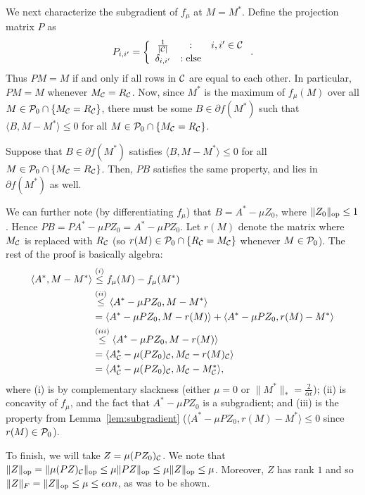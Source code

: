 \documentclass[11pt]{article}
\newcommand{\Mm}{M^*}
\newcommand{\Aa}{A^*}
\begin{document}
We next characterize the subgradient of $f_{\mu}$ at $M = \Mm$.
Define the projection matrix $P$ as
\[ P_{i,i'} = \left\{ \begin{array}{ccl} \frac{1}{|\mathcal{C}|} & : & i, i' \in \mathcal{C} \\ \delta_{i,i'} & : \text{else} \end{array} \right.. \]
Thus $PM = M$ if and only if all rows in $\mathcal{C}$ are equal to each other.
In particular, $PM = M$ whenever $M_{\mathcal{C}} = R_{\mathcal{C}}$. Now, since $\Mm$ is the maximum 
of $f_{\mu}(M)$ over all $M \in \mathcal{P}_0 \cap \{M_{\mathcal{C}} = R_{\mathcal{C}}\}$, there must be some 
$B \in \partial f(\Mm)$ such that $\langle B, M - \Mm \rangle \leq 0$ for all $M \in \mathcal{P}_0 \cap \{M_{\mathcal{C}} = R_{\mathcal{C}}\}$.
\begin{lemma}
\label{lem:subgradient}
Suppose that $B \in \partial f(\Mm)$ satisfies $\langle B, M - \Mm \rangle \leq 0$ for all $M \in \mathcal{P}_0 \cap \{M_{\mathcal{C}} = R_{\mathcal{C}}\}$. 
Then, $PB$ satisfies the same property, and lies in $\partial f(\Mm)$ as well.
\end{lemma}
We can further note (by differentiating $f_{\mu}$) that 
$B = \Aa - \mu Z_0$, where $\|Z_0\|_{\mathrm{op}} \leq 1$. Hence 
$PB = P\Aa - \mu PZ_0 = \Aa - \mu PZ_0$. Let $r(M)$ denote the 
matrix where $M_{\mathcal{C}}$ is replaced with $R_{\mathcal{C}}$ (so $r(M) \in \mathcal{P}_0 \cap \{R_{\mathcal{C}} = M_{\mathcal{C}}\}$ 
whenever $M \in \mathcal{P}_0$). The rest of the proof is basically algebra:
\begin{align}
\langle \Aa, M - \Mm \rangle &\stackrel{(i)}{\leq} f_{\mu}(M) - f_{\mu}(\Mm) \\
 &\stackrel{(ii)}{\leq} \langle \Aa - \mu PZ_0, M - \Mm \rangle \\
 &= \langle \Aa - \mu PZ_0, M - r(M) \rangle + \langle \Aa - \mu PZ_0, r(M) - \Mm \rangle \\
 &\stackrel{(iii)}{\leq} \langle \Aa - \mu PZ_0, M - r(M) \rangle \\
 &= \langle \Aa_{\sC} - \mu (PZ_0)_{\sC}, M_{\sC} - r(M)_{\sC} \rangle \\
 &= \langle \Aa_{\sC} - \mu (PZ_0)_{\sC}, M_{\sC} - \Mm_{\sC} \rangle,
\end{align}
where (i) is by complementary slackness (either $\mu = 0$ or $\|\Mm\|_* = \frac{2}{\alpha\epsilon}$); 
(ii) is concavity of $f_{\mu}$, and the fact that $\Aa - \mu PZ_0$ is a subgradient; and 
(iii) is the property from Lemma~\ref{lem:subgradient} ($\langle \Aa - \mu PZ_0, r(M) - \Mm \rangle \leq 0$ since 
$r(M) \in \mathcal{P}_0$).

To finish, we will take $Z = \mu (PZ_0)_{\mathcal{C}}$. We note that
$\|Z\|_{\mathrm{op}} = \|\mu (PZ)_{\mathcal{C}}\|_{\mathrm{op}} \leq \mu \|PZ\|_{\mathrm{op}} \leq \mu \|Z\|_{\mathrm{op}} \leq \mu$.
Moreover, $Z$ has rank $1$ and so $\|Z\|_F = \|Z\|_{\mathrm{op}} \leq \mu \leq \epsilon\alpha n$, as was to be shown.
\end{document}
